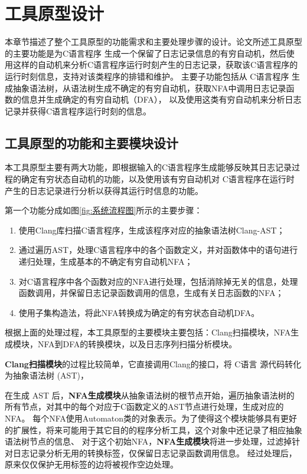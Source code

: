 \chapter{工具原型设计}
本章节描述了整个工具原型的功能需求和主要处理步骤的设计。论文所述工具原型的主要功能是为C语言程序
生成一个保留了日志记录信息的有穷自动机，然后使用这样的自动机来分析C语言程序运行时刻产生的日志记录，获取该C语言程序的运行时刻信息，支持对该类程序的排错和维护。
主要子功能包括从 C语言程序 生成抽象语法树，从语法树生成不确定的有穷自动机，获取NFA中调用日志记录函数的信息并生成确定的有穷自动机（DFA），
以及使用这类有穷自动机来分析日志记录并获得C语言程序运行时刻的信息。

\section{工具原型的功能和主要模块设计}
本工具原型主要有两大功能，即根据输入的C语言程序生成能够反映其日志记录过程的确定有穷状态自动机的功能，以及使用该有穷自动机对
C语言程序在运行时产生的日志记录进行分析以获得其运行时信息的功能。

第一个功能分成如图\ref{fig:系统流程图}所示的主要步骤：
\begin{enumerate}
	\item 使用Clang库扫描C语言程序，生成该程序对应的抽象语法树Clang-AST；
    \item 通过遍历AST，处理C语言程序中的各个函数定义，并对函数体中的语句进行递归处理，生成基本的不确定有穷自动机NFA；
    \item 对C语言程序中各个函数对应的NFA进行处理，包括消除掉无关的信息，处理函数调用，并保留日志记录函数调用的信息，生成有关日志函数的NFA；
    \item 使用子集构造法，将此NFA转换成为确定的有穷状态自动机DFA。
\end{enumerate}

根据上面的处理过程，本工具原型的主要模块主要包括：Clang扫描模块，NFA生成模块，NFA到DFA的转换模块，以及日志序列扫描分析模块。

\textbf{Clang扫描模块}的过程比较简单，它直接调用Clang的接口，将 C语言 源代码转化为抽象语法树 (AST)，

在生成 AST 后，\textbf{NFA生成模块}从抽象语法树的根节点开始，遍历抽象语法树的所有节点，对其中的每个对应于C函数定义的AST节点进行处理，生成对应的 NFA。
每个NFA使用Automaton类的对象表示。为了使得这个模块能够具有更好的扩展性，将来可能用于其它目的的程序分析工具，这个对象中还记录了相应抽象语法树节点的信息、
对于这个初始NFA，\textbf{NFA生成模块}将进一步处理，过滤掉针对日志记录分析无用的转换标签，仅保留日志记录函数调用信息。
经过处理后，原来仅仅保护无用标签的边将被视作空边处理。

